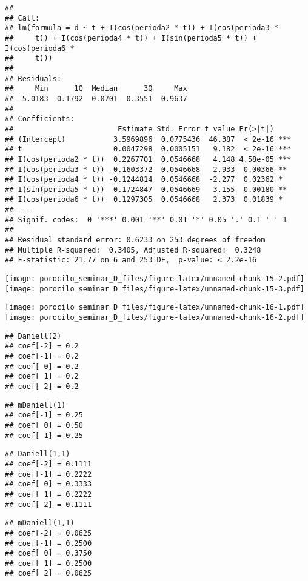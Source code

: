 \documentclass[
]{article}
\begin{document}
\begin{verbatim}
## 
## Call:
## lm(formula = d ~ t + I(cos(perioda2 * t)) + I(cos(perioda3 * 
##     t)) + I(cos(perioda4 * t)) + I(sin(perioda5 * t)) + I(cos(perioda6 * 
##     t)))
## 
## Residuals:
##     Min      1Q  Median      3Q     Max 
## -5.0183 -0.1792  0.0701  0.3551  0.9637 
## 
## Coefficients:
##                        Estimate Std. Error t value Pr(>|t|)    
## (Intercept)           3.5969896  0.0775436  46.387  < 2e-16 ***
## t                     0.0047298  0.0005151   9.182  < 2e-16 ***
## I(cos(perioda2 * t))  0.2267701  0.0546668   4.148 4.58e-05 ***
## I(cos(perioda3 * t)) -0.1603372  0.0546668  -2.933  0.00366 ** 
## I(cos(perioda4 * t)) -0.1244814  0.0546668  -2.277  0.02362 *  
## I(sin(perioda5 * t))  0.1724847  0.0546669   3.155  0.00180 ** 
## I(cos(perioda6 * t))  0.1297305  0.0546668   2.373  0.01839 *  
## ---
## Signif. codes:  0 '***' 0.001 '**' 0.01 '*' 0.05 '.' 0.1 ' ' 1
## 
## Residual standard error: 0.6233 on 253 degrees of freedom
## Multiple R-squared:  0.3405, Adjusted R-squared:  0.3248 
## F-statistic: 21.77 on 6 and 253 DF,  p-value: < 2.2e-16
\end{verbatim}

\texttt{[image: porocilo\_seminar\_D\_files/figure-latex/unnamed-chunk-15-2.pdf]}
\texttt{[image: porocilo\_seminar\_D\_files/figure-latex/unnamed-chunk-15-3.pdf]}

\texttt{[image: porocilo\_seminar\_D\_files/figure-latex/unnamed-chunk-16-1.pdf]}
\texttt{[image: porocilo\_seminar\_D\_files/figure-latex/unnamed-chunk-16-2.pdf]}

\begin{verbatim}
## Daniell(2) 
## coef[-2] = 0.2
## coef[-1] = 0.2
## coef[ 0] = 0.2
## coef[ 1] = 0.2
## coef[ 2] = 0.2
\end{verbatim}

\begin{verbatim}
## mDaniell(1) 
## coef[-1] = 0.25
## coef[ 0] = 0.50
## coef[ 1] = 0.25
\end{verbatim}

\begin{verbatim}
## Daniell(1,1) 
## coef[-2] = 0.1111
## coef[-1] = 0.2222
## coef[ 0] = 0.3333
## coef[ 1] = 0.2222
## coef[ 2] = 0.1111
\end{verbatim}

\begin{verbatim}
## mDaniell(1,1) 
## coef[-2] = 0.0625
## coef[-1] = 0.2500
## coef[ 0] = 0.3750
## coef[ 1] = 0.2500
## coef[ 2] = 0.0625
\end{verbatim}
\end{document}
